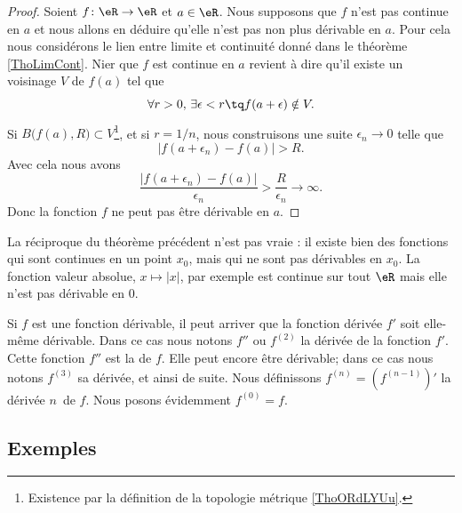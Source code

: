 \begin{proof}
	Soient \( f\colon \eR\to \eR\) et \( a\in \eR\). Nous supposons que \( f\) n'est pas continue en \( a\) et nous allons en déduire qu'elle n'est pas non plus dérivable en \( a\). Pour cela nous considérons le lien entre limite et continuité donné dans le théorème \ref{ThoLimCont}. Nier que \( f\) est continue en \( a\) revient à dire qu'il existe un voisinage \( V\) de \( f(a)\) tel que
	\begin{equation}
		\forall r>0,\,\exists \epsilon<r \tq f(a+\epsilon)\notin V.
	\end{equation}
	Si \( B\big( f(a),R \big)\subset V\)\footnote{Existence par la définition de la topologie métrique \ref{ThoORdLYUu}.}, et si \( r=1/n\), nous construisons une suite \( \epsilon_n\to 0\) telle que
	\begin{equation}
		| f(a+\epsilon_n)-f(a) |>R.
	\end{equation}
	Avec cela nous avons
	\begin{equation}
		\frac{ | f(a+\epsilon_n)-f(a) | }{ \epsilon_n }>\frac{ R }{ \epsilon_n }\to \infty.
	\end{equation}
	Donc la fonction \( f\) ne peut pas être dérivable en \( a\).
\end{proof}

\begin{remark}
	La réciproque du théorème précédent n'est pas vraie : il existe bien des fonctions qui sont continues en un point \( x_0\), mais qui ne sont pas dérivables en \( x_0\). La fonction valeur absolue, \( x\mapsto |x|\), par exemple est continue sur tout \( \eR\) mais elle n'est pas dérivable en \( 0\).
\end{remark}

Si \( f\) est une fonction dérivable, il peut arriver que la fonction dérivée \( f'\) soit elle-même dérivable. Dans ce cas nous notons \( f''\) ou \( f^{(2)}\) la dérivée de la fonction \( f'\). Cette fonction \( f''\) est la  de \( f\). Elle peut encore être dérivable; dans ce cas nous notons \( f^{(3)}\) sa dérivée, et ainsi de suite. Nous définissons \( f^{(n)}=(f^{(n-1)})'\) la dérivée \( n\)\ieme\ de \( f\). Nous posons évidemment \( f^{(0)}=f\).

\subsection{Exemples}


